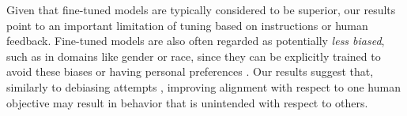 Given that fine-tuned models are typically considered to be superior,
our results point to an important limitation of tuning based on instructions or human feedback.
Fine-tuned models are also often regarded as potentially \emph{less biased},
such as in domains like gender or race,
since they can be explicitly trained to avoid these biases or having personal preferences 
\cite{2303.08774}.
Our results suggest that, 
similarly to debiasing attempts \cite{gonen2019lipstick},
improving alignment with respect to one human objective
may result in behavior that is unintended with respect to others.

